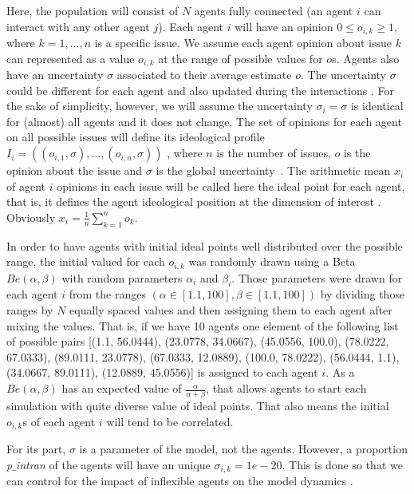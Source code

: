 \documentclass{article}
\begin{document}
Here, the population will consist of  \(N\) agents fully connected (an agent $i$ can interact with any other agent $j$). Each agent $i$ will have an opinion $0\leq o_{i,k} \geq 1$, where $k=1, \ldots, n$ is a specific issue. We assume each agent opinion about issue $k$ can represented as a value $o_{i,k}$ at the range of possible values for $o$s. Agents also have an uncertainty $\sigma$ associated to their average estimate $o$. The uncertainty $\sigma$ could be different for each agent and also updated during the interactions \cite{martins08c}. For the sake of simplicity, however, we will assume the uncertainty $\sigma_i =\sigma$ is identical for (almost) all agents and it does not change. The set of opinions for each agent on all possible issues will define its ideological profile
\(I_i
=
(
(o_{i, 1}, \sigma),
\ldots,
(o_{i, n}, \sigma)
)
\)
, where \(n\) is the number of issues, \(o\) is
the opinion about the issue and \(\sigma\) is the global  uncertainty~\cite{martins12b}. The arithmetic mean  $x_i$  of agent $i$ opinions in each issue will be called here the ideal point for each agent, that is, it defines the agent ideological position at the
dimension of interest \cite{armstrong2014analyzing}. Obviously
\(
x_i
=
\frac{1}{n}
\sum_{k=1}^{n}
o_{k}
\).

In order to have agents with initial ideal points well distributed over the
possible range, the initial valued for each \(o_{i, k}\) was randomly drawn
using a Beta \(Be(\alpha, \beta)\) with random parameters $\alpha_i$ and
$\beta_i$. Those parameters were drawn for each agent $i$ from the ranges \( (
\alpha \in [1.1, 100], \beta \in [1.1, 100] ) \) by dividing those ranges by
\(N\) equally spaced values and then assigning them to each agent after mixing
the values. That is, if we have 10 agents one element of the following list of
possible pairs [(1.1, 56.0444), (23.0778, 34.0667), (45.0556, 100.0), (78.0222,
67.0333), (89.0111, 23.0778), (67.0333, 12.0889), (100.0, 78.0222), (56.0444,
1.1), (34.0667, 89.0111), (12.0889, 45.0556)] is assigned to each agent \(i\).
As a \(Be(\alpha, \beta)\) has an expected value of
$\frac{\alpha}{\alpha+\beta}$, that allows agents to start each simulation with
quite diverse value of ideal points. That also means the initial \(o_{i, k}\)s
of each agent $i$ will tend to be correlated.

For its part, \(\sigma\) is a parameter of the model, not the agents. However, a
proportion \textit{p$\_$intran} of the agents will have an unique \(\sigma_{i,k}
= 1e-20\). This is done so that we can control for the impact of inflexible
agents on the model dynamics \cite{galam05b,deffuant2002can,martinsgalam13a}.
\end{document}
